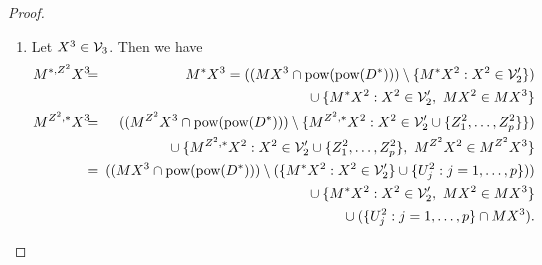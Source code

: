 \documentclass{fundam}
\newcommand{\pow}{\mbox{\rm pow}}
\begin{document}
\begin{proof}
\begin{enumerate}
\item  Let $X^3 \in {\cal V}_3$. Then we have
    \hspace*{-2cm}
    \begin{eqnarray}
        M^{*,Z^2}X^3 & \!\!\!=\!\!\! & M^{*}X^3 =
                        ((MX^3 \cap \pow(\pow(D^{*}))) \setminus
                        \{M^{*}X^2: X^2 \in {\cal V}'_{2}\}) \notag\\
                 &   &  \phantom{M^{*}A =} \qquad\cup \{M^{*}X^2: X^2 \in {\cal V}'_{2},~MX^2 \in MX^3\}
                       \label{a5}\\
        M^{Z^2,*}X^3 & \!\!\!=\!\!\! & ((M^{Z^2}X^3 \cap \pow(\pow(D^{*}))) \setminus
                        \{M^{Z^2,*}X^2: X^2 \in {\cal V}'_{2} \cup
                             \{Z_{1}^2,\ldots,Z_{p}^2\}\}) \notag\\
                 &   &  \qquad {}\cup \{M^{Z^2,*}X^2: X^2 \in {\cal V}'_{2} \cup
                             \{Z_{1}^2,\ldots,Z_{p}^2\},~M^{Z^2}X^2 \in M^{Z^2}X^3\} \notag\\
                 & \!\!\!=\!\!\! & ((MX^3 \cap \pow(\pow(D^{*}))) \setminus
                        (\{M^{*}X^2: X^2 \in {\cal V}'_{2}\} \cup
                        \{U_{j}^2: j = 1,\ldots,p \})) \notag\\
                 &   &  \qquad {}\cup \{M^{*}X^2: X^2 \in {\cal
		 V}'_{2},~MX^2 \in MX^3\} \notag\\
                 &   &  \qquad {}\cup (\{U_{j}^2: j = 1,\ldots,p\} \cap
			MX^3).\label{a6}
    \end{eqnarray}


\end{enumerate}
\end{proof}
\end{document}
